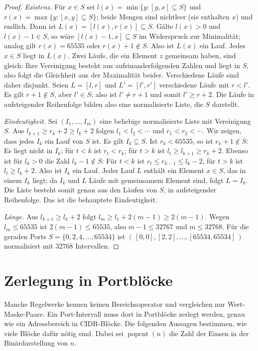 \documentclass[a4paper,12pt, twoside]{report}
\theoremstyle{definition}
\DeclareMathOperator{\popcnt}{popcnt}
\begin{document}
\begin{proof}
	\emph{Existenz.} Für $x \in S$ sei $l(x) = \min\{y : [y,x]\subseteq S\}$ und $r(x) = \max\{y: [x,y]\subseteq S\}$; beide Mengen sind nichtleer (sie enthalten $x$) und endlich. Dann ist $L(x) = [l(x),r(x)] \subseteq S$. Gälte $l(x)>0$ und $l(x)-1\in S$, so wäre $[l(x)-1,x]\subseteq S$ im Widerspruch zur Minimalität; analog gilt $r(x)=65535$ oder $r(x)+1\notin S$. Also ist $L(x)$ ein Lauf. Jedes $x\in S$ liegt in $L(x)$. Zwei Läufe, die ein Element $z$ gemeinsam haben, sind gleich: Ihre Vereinigung besteht aus aufeinanderfolgenden Zahlen und liegt in $S$, also folgt die Gleichheit aus der Maximalität beider. Verschiedene Läufe sind daher disjunkt. Seien $L = [l,r]$ und $L' = [l',r']$ verschiedene Läufe mit $r < l'$. Es gilt $r+1\notin S$, aber $l' \in S$; also ist $l' \neq r+1$ und somit $l' \ge r+2$. Die Läufe in aufsteigender Reihenfolge bilden also eine normalisierte Liste, die $S$ darstellt.

	\emph{Eindeutigkeit.} Sei $(I_1,\ldots,I_m)$ eine beliebige normalisierte Liste mit Vereinigung $S$. Aus $l_{k+1}\ge r_k+2 \ge l_k+2$ folgen $l_1<l_2<\cdots$ und $r_1<r_2<\cdots$. Wir zeigen, dass jedes $I_k$ ein Lauf von $S$ ist. Es gilt $I_k \subseteq S$. Ist $r_k < 65535$, so ist $r_k+1\notin S$: Es liegt nicht in $I_k$; für $t<k$ ist $r_t < r_k$; für $t>k$ ist $l_t \ge l_{k+1} \ge r_k+2$. Ebenso ist für $l_k>0$ die Zahl $l_k-1\notin S$: Für $t<k$ ist $r_t \le r_{k-1} \le l_k-2$, für $t>k$ ist $l_t\ge l_k+2$. Also ist $I_k$ ein Lauf. Jeder Lauf $L$ enthält ein Element $x\in S$, das in einem $I_k$ liegt; da $I_k$ und $L$ Läufe mit gemeinsamem Element sind, folgt $L=I_k$. Die Liste besteht somit genau aus den Läufen von $S$, in aufsteigender Reihenfolge. Das ist die behauptete Eindeutigkeit.

	\emph{Länge.} Aus $l_{k+1}\ge l_k+2$ folgt $l_m \ge l_1 + 2(m-1) \ge 2(m-1)$. Wegen $l_m\le 65535$ ist $2(m-1)\le 65535$, also $m-1 \le 32767$ und $m \le 32768$. Für die geraden Ports $S=\{0,2,4,\ldots,65534\}$ ist $(\,[0,0],[2,2],\ldots,[65534,65534]\,)$ normalisiert mit $32768$ Intervallen.
\end{proof}

\section{Zerlegung in Portblöcke}

Manche Regelwerke kennen keinen Bereichsoperator und vergleichen nur Wert-Maske-Paare. Ein Port-Intervall muss dort in Portblöcke zerlegt werden, genau wie ein Adressbereich in CIDR-Blöcke. Die folgenden Aussagen bestimmen, wie viele Blöcke dafür nötig sind. Dabei sei $\popcnt(n)$ die Zahl der Einsen in der Binärdarstellung von $n$.
\end{document}
